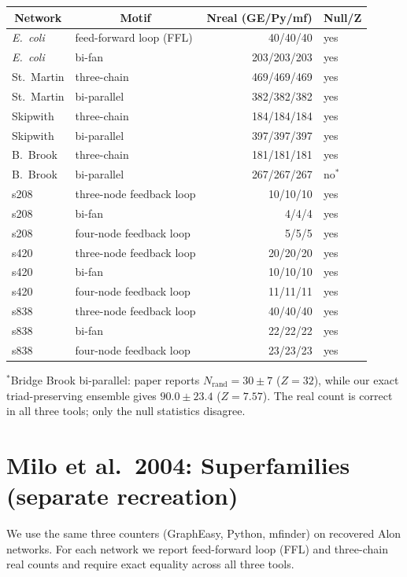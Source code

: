\documentclass[11pt]{article}
\begin{document}
\begin{center}
\begin{tabular}{l l r l}
\toprule
\multicolumn{1}{c}{Network} & \multicolumn{1}{c}{Motif} & \multicolumn{1}{c}{Nreal (GE/Py/mf)} & \multicolumn{1}{c}{Null/Z} \\
\midrule
\textit{E.\ coli} & feed-forward loop (FFL) & 40/40/40 & yes \\
\textit{E.\ coli} & bi-fan & 203/203/203 & yes \\
St.\ Martin & three-chain & 469/469/469 & yes \\
St.\ Martin & bi-parallel & 382/382/382 & yes \\
Skipwith & three-chain & 184/184/184 & yes \\
Skipwith & bi-parallel & 397/397/397 & yes \\
B.\ Brook & three-chain & 181/181/181 & yes \\
B.\ Brook & bi-parallel & 267/267/267 & no$^*$ \\
s208 & three-node feedback loop & 10/10/10 & yes \\
s208 & bi-fan & 4/4/4 & yes \\
s208 & four-node feedback loop & 5/5/5 & yes \\
s420 & three-node feedback loop & 20/20/20 & yes \\
s420 & bi-fan & 10/10/10 & yes \\
s420 & four-node feedback loop & 11/11/11 & yes \\
s838 & three-node feedback loop & 40/40/40 & yes \\
s838 & bi-fan & 22/22/22 & yes \\
s838 & four-node feedback loop & 23/23/23 & yes \\
\bottomrule
\end{tabular}
\end{center}

$^*$Bridge Brook bi-parallel: paper reports $N_{\mathrm{rand}}=30\pm 7$ ($Z=32$),
while our exact triad-preserving ensemble gives $90.0\pm 23.4$ ($Z=7.57$).
The real count is correct in all three tools; only the null statistics disagree.

\section{Milo et al.\ 2004: Superfamilies (separate recreation)}

We use the same three counters (GraphEasy, Python, mfinder) on recovered Alon networks.
For each network we report feed-forward loop (FFL) and three-chain real counts and require exact equality across all three tools.
\end{document}
